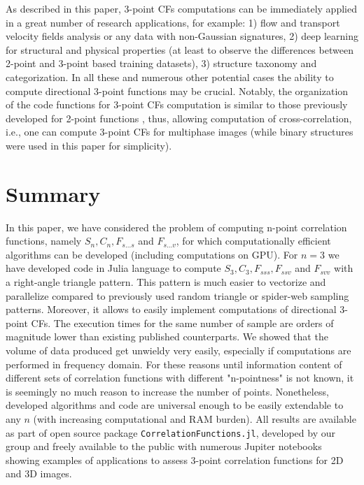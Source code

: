 \documentclass[reprint,amsmath,amssymb,aps,pre,showkeys,showpacs]{revtex4-1}
\newcommand{\code}[1]{\colorbox{light-gray}{\texttt{#1}}}
\begin{document}
As described in this paper, 3-point CFs computations can be immediately applied
in a great number of research applications, for example: 1) flow and transport
velocity fields analysis or any data with non-Gaussian signatures, 2) deep
learning for structural and physical properties (at least to observe the
differences between 2-point and 3-point based training datasets), 3) structure
taxonomy and categorization. In all these and numerous other potential cases the
ability to compute directional 3-point functions may be crucial. Notably, the
organization of the code functions for 3-point CFs computation is similar to
those previously developed for 2-point functions \cite{CFsjlpaper}, thus,
allowing computation of cross-correlation, i.e., one can compute 3-point CFs for
multiphase images (while binary structures were used in this paper for
simplicity).

\section{Summary}
In this paper, we have considered the problem of computing n-point correlation
functions, namely $S_n, C_n, F_{s...s}$ and $F_{s...v}$, for which
computationally efficient algorithms can be developed (including computations on
GPU). For $n=3$ we have developed code in Julia language to compute $S_3, C_3,
F_{sss}, F_{ssv}$ and $F_{svv}$ with a right-angle triangle pattern. This
pattern is much easier to vectorize and parallelize compared to previously used
random triangle or spider-web sampling patterns. Moreover, it allows to easily
implement computations of directional 3-point CFs. The execution times for the
same number of sample are orders of magnitude lower than existing published
counterparts. We showed that the volume of data produced get unwieldy very
easily, especially if computations are performed in frequency domain. For these
reasons until information content of different sets of correlation functions
with different "n-pointness" is not known, it is seemingly no much reason to
increase the number of points. Nonetheless, developed algorithms and code are
universal enough to be easily extendable to any $n$ (with increasing
computational and RAM burden). All results are available as part of open source
package \code{CorrelationFunctions.jl}, developed by our group and freely
available to the public with numerous Jupiter notebooks showing examples of
applications to assess 3-point correlation functions for 2D and 3D images.

\appendix
\end{document}
